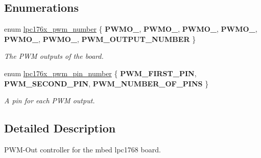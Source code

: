 \subsection*{Enumerations}
\begin{DoxyCompactItemize}
\item 
\mbox{\label{pwmout-defs_8h_a509ac355a5afbf0106221625c142d791}} 
enum \mbox{\hyperlink{pwmout-defs_8h_a509ac355a5afbf0106221625c142d791}{lpc176x\+\_\+pwm\+\_\+number}} \{ \newline
{\bfseries P\+W\+M\+O\+\_}, 
{\bfseries P\+W\+M\+O\+\_}, 
{\bfseries P\+W\+M\+O\+\_}, 
{\bfseries P\+W\+M\+O\+\_}, 
\newline
{\bfseries P\+W\+M\+O\+\_}, 
{\bfseries P\+W\+M\+O\+\_}, 
{\bfseries P\+W\+M\+\_\+\+O\+U\+T\+P\+U\+T\+\_\+\+N\+U\+M\+B\+ER}
 \}
\begin{DoxyCompactList}\small\item\em The P\+WM outputs of the board. \end{DoxyCompactList}\item 
\mbox{\label{pwmout-defs_8h_a37b4a56a9ca3d7fbfe4dc8047abce493}} 
enum \mbox{\hyperlink{pwmout-defs_8h_a37b4a56a9ca3d7fbfe4dc8047abce493}{lpc176x\+\_\+pwm\+\_\+pin\+\_\+number}} \{ {\bfseries P\+W\+M\+\_\+\+F\+I\+R\+S\+T\+\_\+\+P\+IN}, 
{\bfseries P\+W\+M\+\_\+\+S\+E\+C\+O\+N\+D\+\_\+\+P\+IN}, 
{\bfseries P\+W\+M\+\_\+\+N\+U\+M\+B\+E\+R\+\_\+\+O\+F\+\_\+\+P\+I\+NS}
 \}
\begin{DoxyCompactList}\small\item\em A pin for each P\+WM output. \end{DoxyCompactList}\end{DoxyCompactItemize}


\subsection{Detailed Description}
P\+W\+M-\/\+Out controller for the mbed lpc1768 board. 

